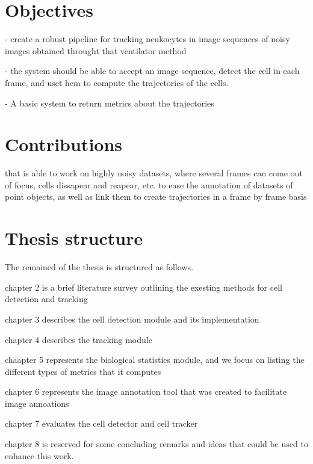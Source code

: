 	\section{Objectives }
		
		- create a robust pipeline for tracking neukocytes in image sequences of noisy images obtained throught that ventilator method
		
		- the system should be able to accept an image sequence, detect the cell in each frame, and uset hem to compute the trajectories of the cells.
		
		- A basic system to return metrics about the trajectories
		
	\section{Contributions }
		 that is able to work on highly noisy datasets, where several frames can come out of focus, cells dissapear and reapear, etc.
		to ease the annotation of datasets of point objects, as well as link them to create trajectories in a frame by frame basis
	\section{Thesis structure }
		The remained of the thesis is structured as follows. 
		
		chapter 2 is a brief literature survey outlining the exesting methods for cell detection and tracking
		
		chapter 3 describes the cell detection module and its implementation
		
		chapter 4 describes the tracking module
		
		chaapter 5 represents the biological statistics module, and we focus on listing the different types of metrics that it computes
		
		chapter 6 represents the image annotation tool that was created to facilitate image annoations
		
		chapter 7 evaluates the cell detector and cell tracker
		
		chapter 8 is reserved for some concluding remarks and ideas that could be used to enhance this work.